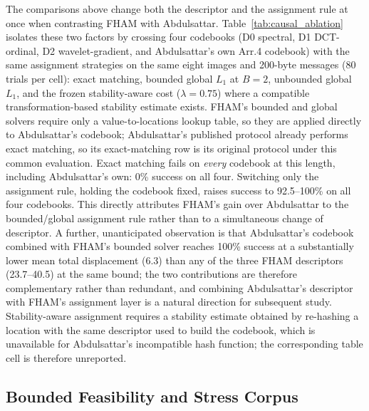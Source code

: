 \documentclass[preprint,12pt]{elsarticle}
\theoremstyle{plain}
\providecommand{\DIFaddtex}[1]{{\protect\color{blue} \sf #1}} %
\providecommand{\DIFdeltex}[1]{{\protect\color{red} \scriptsize #1}} %
\providecommand{\DIFaddbegin}{} %
\providecommand{\DIFaddend}{} %
\providecommand{\DIFdelbegin}{} %
\providecommand{\DIFdelend}{} %
\providecommand{\DIFadd}[1]{\texorpdfstring{\DIFaddtex{#1}}{#1}} %
\providecommand{\DIFdel}[1]{\texorpdfstring{\DIFdeltex{#1}}{}} %
\providecommand{\DIFscaledelfig}{0.5}
\newlength{\DIFdelgraphicswidth} %
\newlength{\DIFdelgraphicsheight} %
\providecommand{\DIFaddincludegraphics}[2][]{{\color{blue}\fbox{\DIFOincludegraphics[#1]{#2}}}} %
\providecommand{\DIFdelincludegraphics}[2][]{%
\sbox{\DIFdelgraphicsbox}{\DIFOincludegraphics[#1]{#2}}%
\settoboxwidth{\DIFdelgraphicswidth}{\DIFdelgraphicsbox} %
\settoboxtotalheight{\DIFdelgraphicsheight}{\DIFdelgraphicsbox} %
\scalebox{\DIFscaledelfig}{%
\parbox[b]{\DIFdelgraphicswidth}{\usebox{\DIFdelgraphicsbox}\\[-\baselineskip] \rule{\DIFdelgraphicswidth}{0em}}\llap{\resizebox{\DIFdelgraphicswidth}{\DIFdelgraphicsheight}{%
\setlength{\unitlength}{\DIFdelgraphicswidth}%
\begin{picture}(1,1)%
\thicklines\linethickness{2pt} %
{\color[rgb]{1,0,0}\put(0,0){\framebox(1,1){}}}%
{\color[rgb]{1,0,0}\put(0,0){\line( 1,1){1}}}%
{\color[rgb]{1,0,0}\put(0,1){\line(1,-1){1}}}%
\end{picture}%
}\hspace*{3pt}}} %
} %
\DeclareRobustCommand{\DIFaddbegin}{\DIFOaddbegin \let\includegraphics\DIFaddincludegraphics} %
\DeclareRobustCommand{\DIFaddend}{\DIFOaddend \let\includegraphics\DIFOincludegraphics} %
\DeclareRobustCommand{\DIFdelbegin}{\DIFOdelbegin \let\includegraphics\DIFdelincludegraphics} %
\DeclareRobustCommand{\DIFdelend}{\DIFOaddend \let\includegraphics\DIFOincludegraphics} %
\renewcommand{\DIFdel}[1]{}
\renewcommand{\DIFdelincludegraphics}[2][]{}
\begin{document}
The comparisons above change both the descriptor and the assignment rule at
once when contrasting FHAM with Abdulsattar. Table~\ref{tab:causal_ablation}
isolates these two factors by crossing four codebooks (D0 spectral, D1
DCT-ordinal, D2 wavelet-gradient, and Abdulsattar's own Arr.4 codebook) with
the same assignment strategies on the same eight images and 200-byte
messages (80 trials per cell): exact matching, bounded global $L_1$ at
$B=2$, unbounded global $L_1$, and the frozen stability-aware cost
($\lambda=0.75$) where a compatible transformation-based stability estimate
exists. FHAM's bounded and global solvers require only a value-to-locations
lookup table, so they are applied \DIFaddbegin \DIFadd{directly }\DIFaddend to Abdulsattar's codebook\DIFdelbegin \DIFdel{without
modifying it}\DIFdelend ; Abdulsattar's published protocol already performs exact
matching, so its exact-matching row is its original protocol under this
common evaluation. Exact matching fails on \emph{every} codebook at this
length, including Abdulsattar's own: 0\% success on all four. Switching only
the assignment rule, holding the codebook fixed, raises success to
92.5--100\% on all four codebooks. This directly attributes FHAM's gain over
Abdulsattar to the bounded/global assignment rule rather than to a
simultaneous change of descriptor. A further, unanticipated observation is
that Abdulsattar's codebook combined with FHAM's bounded solver reaches 100\%
success at a substantially lower mean total displacement (6.3) than any of
the three FHAM descriptors (23.7--40.5) at the same bound; the two
contributions are therefore complementary rather than redundant, and
combining Abdulsattar's descriptor with FHAM's assignment layer is a natural
direction for subsequent study. Stability-aware assignment requires a
stability estimate obtained by
re-hashing a location with the same descriptor used to build the codebook,
which is unavailable for Abdulsattar's incompatible hash function; the
corresponding table cell is therefore unreported.

\begin{table}[!t]
\centering
\caption{Causal Codebook Ablation at 200 Bytes (80 Trials per Cell)}
\label{tab:causal_ablation}

\end{table}

\subsection{Bounded Feasibility and Stress Corpus}
\end{document}
